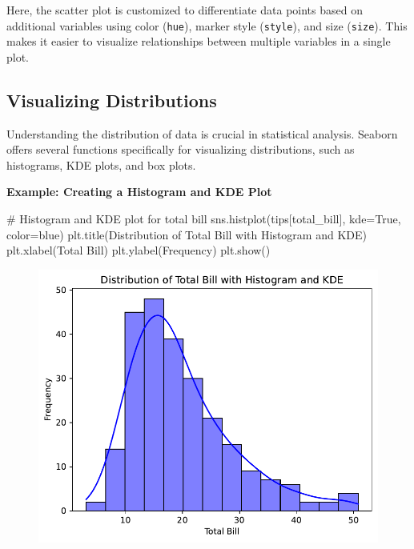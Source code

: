 \documentclass[
  letterpaper,
  DIV=11,
  numbers=noendperiod]{scrreprt}
\newenvironment{Shaded}{\begin{snugshade}}{\end{snugshade}}
\newcommand{\CommentTok}[1]{\textcolor[rgb]{0.37,0.37,0.37}{#1}}
\newcommand{\NormalTok}[1]{\textcolor[rgb]{0.00,0.23,0.31}{#1}}
\newcommand{\OperatorTok}[1]{\textcolor[rgb]{0.37,0.37,0.37}{#1}}
\newcommand{\StringTok}[1]{\textcolor[rgb]{0.13,0.47,0.30}{#1}}
\newcommand{\VariableTok}[1]{\textcolor[rgb]{0.07,0.07,0.07}{#1}}
\begin{document}
Here, the scatter plot is customized to differentiate data points based
on additional variables using color (\texttt{hue}), marker style
(\texttt{style}), and size (\texttt{size}). This makes it easier to
visualize relationships between multiple variables in a single plot.

\hypertarget{visualizing-distributions}{%
\subsection{Visualizing Distributions}\label{visualizing-distributions}}

Understanding the distribution of data is crucial in statistical
analysis. Seaborn offers several functions specifically for visualizing
distributions, such as histograms, KDE plots, and box plots.

\textbf{Example: Creating a Histogram and KDE Plot}

\begin{Shaded}
\begin{Highlighting}[]
\CommentTok{\# Histogram and KDE plot for total bill}
\NormalTok{sns.histplot(tips[}\StringTok{\textquotesingle{}total\_bill\textquotesingle{}}\NormalTok{], kde}\OperatorTok{=}\VariableTok{True}\NormalTok{, color}\OperatorTok{=}\StringTok{\textquotesingle{}blue\textquotesingle{}}\NormalTok{)}
\NormalTok{plt.title(}\StringTok{\textquotesingle{}Distribution of Total Bill with Histogram and KDE\textquotesingle{}}\NormalTok{)}
\NormalTok{plt.xlabel(}\StringTok{\textquotesingle{}Total Bill\textquotesingle{}}\NormalTok{)}
\NormalTok{plt.ylabel(}\StringTok{\textquotesingle{}Frequency\textquotesingle{}}\NormalTok{)}
\NormalTok{plt.show()}
\end{Highlighting}
\end{Shaded}

\begin{figure}[H]

{\centering \includegraphics{15_Data_Vis_files/figure-pdf/cell-12-output-1.pdf}

}

\end{figure}
\end{document}

